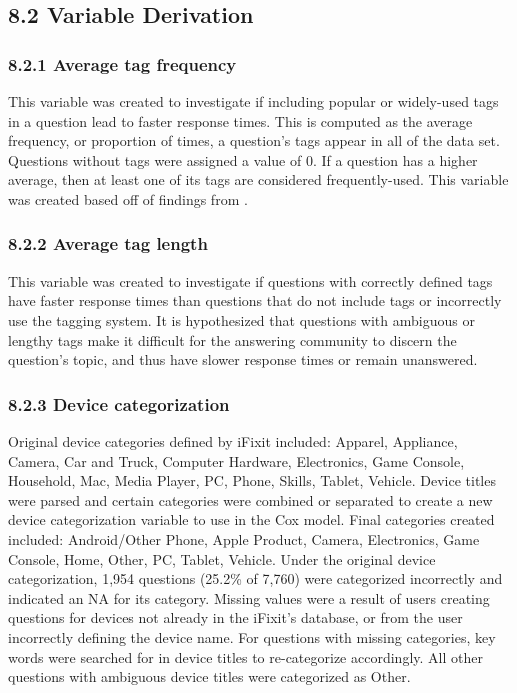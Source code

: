 \documentclass{article}
\begin{document}

\subsection*{8.2 Variable Derivation}

\subsubsection*{8.2.1 Average tag frequency}

This variable was created to investigate if including popular or widely-used tags in a question lead to faster response times. This is computed as the average frequency, or proportion of times, a question's tags appear in all of the data set. Questions without tags were assigned a value of 0.  If a question has a higher average, then at least one of its tags are considered frequently-used. This variable was created based off of findings from \cite{Bhat2014}. 


\subsubsection*{8.2.2 Average tag length}

This variable was created to investigate if questions with correctly defined tags have faster response times than questions that do not include tags or incorrectly use the tagging system. It is hypothesized that questions with ambiguous or lengthy tags make it difficult for the answering community to discern the question's topic, and thus have slower response times or remain unanswered. 


\subsubsection*{8.2.3 Device categorization}

Original device categories defined by iFixit included: Apparel, Appliance, Camera, Car and Truck, Computer Hardware, Electronics, Game Console, Household, Mac, Media Player, PC, Phone, Skills, Tablet, Vehicle. Device titles were parsed and certain categories were combined or separated to create a new device categorization variable to use in the Cox model. Final categories created included: Android/Other Phone, Apple Product, Camera, Electronics, Game Console, Home, Other, PC, Tablet, Vehicle. Under the original device categorization, 1,954 questions (25.2\% of 7,760) were categorized incorrectly and indicated an NA for its category. Missing values were a result of users creating questions for devices not already in the iFixit's database, or from the user incorrectly defining the device name. For questions with missing categories, key words were searched for in device titles to re-categorize accordingly. All other questions with ambiguous device titles were categorized as Other. 
\end{document}
